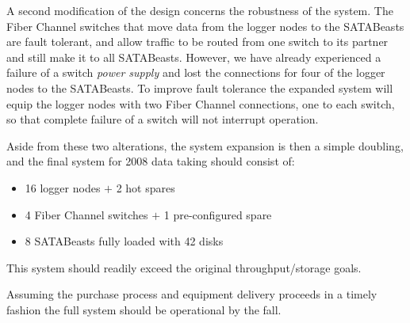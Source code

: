 A second modification of the design concerns the robustness of the system.
The Fiber Channel switches that move data from the logger nodes to the 
SATABeasts are fault tolerant, and allow traffic to be routed from one
switch to its partner and still make it to all SATABeasts. 
However, we have already experienced a failure of a switch {\it power supply}
and lost the connections for four of the logger nodes to the  SATABeasts.
To improve fault tolerance the expanded system will equip the logger nodes
with two Fiber Channel connections, one to each switch, so that complete failure of a switch
will not interrupt operation.

Aside from these two alterations, the system expansion is then a simple doubling,
and the final system for 2008 data taking should consist of:
\begin{itemize}
\item 16 logger nodes $+$ 2 hot spares
\item 4 Fiber Channel switches $+$ 1 pre-configured spare
\item 8 SATABeasts fully loaded with 42 disks
\end{itemize}
This system should readily exceed the original throughput/storage goals.

Assuming the purchase process and equipment delivery proceeds in a timely
fashion  the full system should be operational by the fall.


